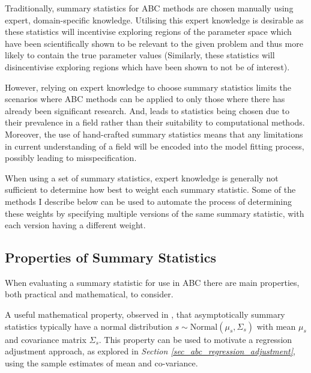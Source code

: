 \documentclass[11pt,a4paper]{article}
\theoremstyle{break}
\begin{document}
  \par Traditionally, summary statistics for ABC methods are chosen manually using expert, domain-specific knowledge. Utilising this expert knowledge is desirable as these statistics will incentivise exploring regions of the parameter space which have been scientifically shown to be relevant to the given problem and thus more likely to contain the true parameter values (Similarly, these statistics will disincentivise exploring regions which have been shown to not be of interest). %


  \par However, relying on expert knowledge to choose summary statistics limits the scenarios where ABC methods can be applied to only those where there has already been significant research. And, leads to statistics being chosen due to their prevalence in a field rather than their suitability to computational methods. Moreover, the use of hand-crafted summary statistics means that any limitations in current understanding of a field will be encoded into the model fitting process, possibly leading to misspecification.

  \par When using a set of summary statistics, expert knowledge is generally not sufficient to determine how best to weight each summary statistic. Some of the methods I describe below can be used to automate the process of determining these weights by specifying multiple versions of the same summary statistic, with each version having a different weight. %

\subsection{Properties of Summary Statistics}\label{sec_properties_of_summary_statistics}

  \par When evaluating a summary statistic for use in ABC there are main properties, both practical and mathematical, to consider.

  \par A useful mathematical property, observed in \cite[]{statistical_inference_for_noisy_nonlinear_ecological_dynamic_systems}, that asymptotically summary statistics typically have a normal distribution $s\sim\text{Normal}(\mu_s,\Sigma_s)$ with mean $\mu_s$ and covariance matrix $\Sigma_s$. This property can be used to motivate a regression adjustment approach, as explored in \textit{Section \ref{sec_abc_regression_adjustment}}, using the sample estimates of mean and co-variance.
\end{document}
